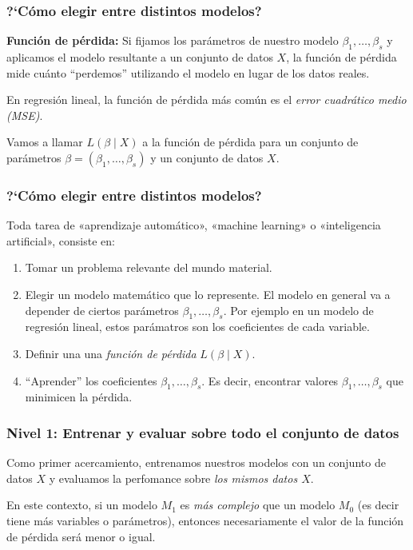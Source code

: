 \documentclass[aspectratio=169,12pt]{beamer}
\begin{document}

\begin{frame}
\frametitle{?`C\'omo elegir entre distintos modelos?}

\textbf{Función de pérdida:} Si fijamos los parámetros de nuestro modelo $\beta_1, \dots, \beta_s$ y aplicamos el modelo resultante a un conjunto de datos $X$, la función de pérdida mide cuánto ``perdemos'' utilizando el modelo en lugar de los datos reales.

En regresión lineal, la función de pérdida más común es el \emph{error cuadrático medio (MSE)}.

Vamos a llamar $L(\beta \mid X)$ a la función de pérdida para un conjunto de par\'ametros $\beta = (\beta_1, \dots, \beta_s)$ y un conjunto de datos $X$.

\end{frame}



\begin{frame}
\frametitle{?`C\'omo elegir entre distintos modelos?}

Toda tarea de «aprendizaje automático», «machine learning» o «inteligencia artificial»,
consiste en:
\begin{enumerate}
\item Tomar un problema relevante del mundo material.
\item Elegir un modelo matemático que lo represente. El modelo en general va a depender de ciertos parámetros $\beta_1, \dots, \beta_s$.
Por ejemplo en un modelo de regresión lineal, estos parámatros son los coeficientes de cada variable.
\item Definir una una \emph{función de pérdida} $L(\beta \mid X)$.
\item ``Aprender'' los coeficientes $\beta_1, \dots, \beta_s$. Es decir, encontrar valores $\beta_1, \dots, \beta_s$ que minimicen la pérdida.
\end{enumerate}
\end{frame}


\begin{frame}
\frametitle{Nivel 1: Entrenar y evaluar sobre todo el conjunto de datos}

Como primer acercamiento, entrenamos nuestros modelos con un conjunto de datos $X$ y evaluamos la perfomance sobre \emph{los mismos datos $X$}.

En este contexto, si un modelo $M_1$ es \emph{más complejo} que un modelo $M_0$ (es decir tiene más variables o parámetros), entonces necesariamente el valor de la función de pérdida será menor o igual.
\end{frame}
\end{document}
